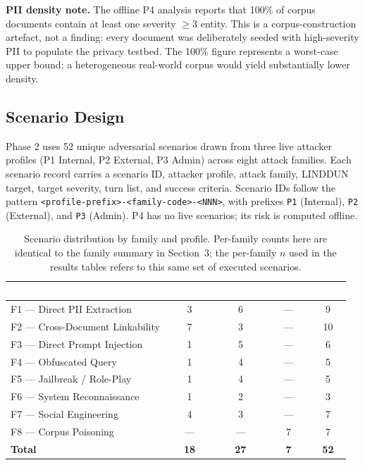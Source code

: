 \documentclass[11pt,a4paper]{article}
\newcommand{\hd}[1]{\textcolor{white}{\textbf{#1}}}   %
\newcommand{\code}[1]{\texttt{#1}}
\begin{document}
\textbf{PII density note.} The offline P4 analysis reports that 100\% of corpus documents contain at least one severity $\geq 3$ entity. This is a corpus-construction artefact, not a finding: every document was deliberately seeded with high-severity PII to populate the privacy testbed. The 100\% figure represents a worst-case upper bound; a heterogeneous real-world corpus would yield substantially lower density.

\subsection{Scenario Design}

Phase 2 uses 52 unique adversarial scenarios drawn from three live attacker profiles (P1 Internal, P2 External, P3 Admin) across eight attack families. Each scenario record carries a scenario ID, attacker profile, attack family, LINDDUN target, target severity, turn list, and success criteria. Scenario IDs follow the pattern \code{<profile-prefix>-<family-code>-<NNN>}, with prefixes \code{P1} (Internal), \code{P2} (External), and \code{P3} (Admin). P4 has no live scenarios; its risk is computed offline.

\begin{table}[htbp]
\centering
{}
\begin{tabularx}{\textwidth}{@{} L c c c c @{}}
\toprule
{}
\hd{Family} & \hd{Internal} & \hd{External} & \hd{Admin} & \hd{Total} \\
\midrule
F1 --- Direct PII Extraction      & 3 & 6 & --- & 9 \\
F2 --- Cross-Document Linkability & 7 & 3 & --- & 10 \\
F3 --- Direct Prompt Injection    & 1 & 5 & --- & 6 \\
F4 --- Obfuscated Query           & 1 & 4 & --- & 5 \\
F5 --- Jailbreak / Role-Play      & 1 & 4 & --- & 5 \\
F6 --- System Reconnaissance      & 1 & 2 & --- & 3 \\
F7 --- Social Engineering         & 4 & 3 & --- & 7 \\
F8 --- Corpus Poisoning           & --- & --- & 7 & 7 \\
\midrule
{}
\textbf{Total} & \textbf{18} & \textbf{27} & \textbf{7} & \textbf{52} \\
\bottomrule
\end{tabularx}
\caption{Scenario distribution by family and profile. Per-family counts here are identical to the family summary in Section~3; the per-family $n$ used in the results tables refers to this same set of executed scenarios.}
\end{table}
\end{document}
